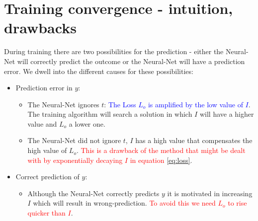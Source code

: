 \documentclass[oneside,12pt]{article}
\begin{document}
\section{Training convergence - intuition, drawbacks}\label{sec:intuition}
During training there are two possibilities for the prediction - either the Neural-Net will correctly predict the outcome or the Neural-Net will have a prediction error. We dwell into the different causes for these possibilities: 
\begin{itemize}
    \item Prediction error in $y$:
    \begin{itemize}
        \item The Neural-Net ignores $t$: \textcolor{blue}{The Loss $L_o$ is amplified by the low value of $I$}. The training algorithm will search a solution in which $I$ will have a higher value and $L_o$ a lower one. 
        \item The Neural-Net did not ignore $t$, $I$ has a high value that compensates the high value of $L_o$. {\textcolor{red}{This is a drawback of the method that might be dealt with by exponentially decaying $I$ in equation \ref{eq:loss}}}.
    \end{itemize}
    \item Correct prediction of $y$:
    \begin{itemize}
        \item Although the Neural-Net correctly predicts $y$ it is motivated in increasing $I$ which will result in wrong-prediction. \textcolor{red}{To avoid this we need $L_o$ to rise quicker than $I$}.
    \end{itemize}
\end{itemize}
%
\end{document}
